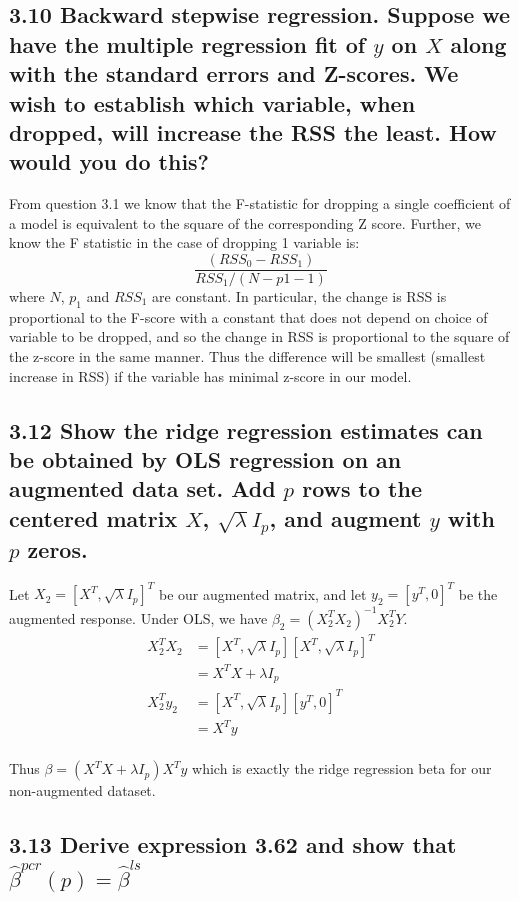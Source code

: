 \subsection*{3.10 Backward stepwise regression. Suppose we have the multiple regression fit of $y$ on $X$ along with the standard errors and Z-scores. We wish to establish which variable, when dropped, will increase the RSS the least. How would you do this?}

From question 3.1 we know that the F-statistic for dropping a single coefficient of a model is equivalent to the square of the corresponding Z score.
Further, we know the F statistic in the case of dropping 1 variable is:
$$ \frac{\left(RSS_0 - RSS_1\right)}{RSS_1 / (N - p1 - 1)}$$
where $N$, $p_1$ and $RSS_1$ are constant. In particular, the change is RSS is proportional to the F-score with a constant that does not depend on choice of variable to be dropped, and so the change in RSS is proportional to the square of the z-score in the same manner. Thus the difference will be smallest (smallest increase in RSS) if the variable has minimal z-score in our model.
\subsection*{3.12 Show the ridge regression estimates can be obtained by OLS regression on an augmented data set. Add $p$ rows to the centered matrix $X$, $\sqrt{\lambda} I_p$, and augment $y$ with $p$ zeros.}

Let $X_2 = [X^T,\sqrt{\lambda} I_p]^T$ be our augmented matrix, and let $y_2 = [y^T,0]^T$ be the augmented response.
Under OLS, we have $\beta_2 = (X_2^T X_2)^{-1} X_2^T Y$.
\begin{align*}
X_2^T X_2 &= [X^T,\sqrt{\lambda} I_p] [X^T,\sqrt{\lambda} I_p]^T \\
&= X^T X + \lambda I_p\\
X_2^T y_2 &= [X^T,\sqrt{\lambda} I_p] [y^T,0]^T \\
&= X^T y\\
\end{align*}

Thus $\beta = \left(X^T X + \lambda I_p\right)X^T y$ which is exactly the ridge regression beta for our non-augmented dataset.
\subsection*{3.13 Derive expression 3.62 and show that $\hat{\beta}^{pcr}(p) = \hat{\beta}^{ls}$}

